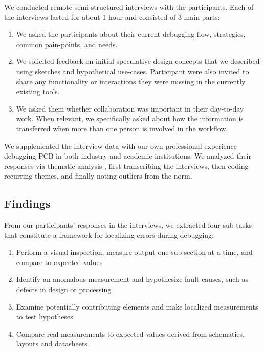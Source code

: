 \documentclass [11pt, proquest] {uwthesis}[2020/02/24]
\begin{document}
 We conducted remote semi-structured interviews with the participants. Each of the interviews lasted for about 1 hour and consisted of 3 main parts:
\begin {enumerate}
\item We asked the participants about their current debugging flow, strategies, common pain-points, and needs.
\item We solicited feedback on initial speculative design concepts that we described using sketches and hypothetical use-cases. Participant were also invited to share any functionality or interactions they were missing in the currently existing tools.
\item We asked them whether collaboration was important in their day-to-day work. When relevant, we specifically asked about how the information is transferred when more than one person is involved in the workflow.
\end {enumerate}
We supplemented the interview data with our own professional experience debugging PCB in both industry and academic institutions.
We analyzed their responses via thematic analysis \cite{Braun2006UsingPsychology}, first transcribing the interviews, then coding recurring themes, and finally noting outliers from the norm.



\subsection{Findings}
\label{subsec:PrestudyFindings}
From our participants' responses in the interviews, we extracted four sub-tasks that constitute a framework for localizing errors during debugging:
\begin{enumerate}

\item Perform a visual inspection, measure output one sub-section at a time, and compare to expected values
\item Identify an anomalous measurement and hypothesize fault causes, such as defects in design or processing
\item Examine potentially contributing elements and make localized measurements to test hypotheses
\item Compare real measurements to expected values derived from schematics, layouts and datasheets
\end{enumerate}
\end{document}
